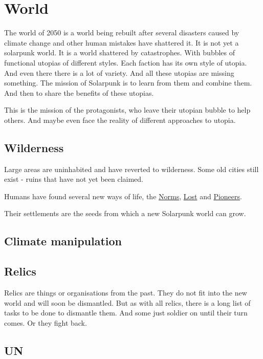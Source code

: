 \chapter{World}

The world of 2050 is a world being rebuilt after several disasters caused by climate change and other human mistakes have shattered it. It is not yet a solarpunk world. It is a world shattered by catastrophes. With bubbles of functional utopias of different styles.
Each faction has its own style of utopia. And even there there is a lot of variety.
And all these utopias are missing something. The mission of Solarpunk is to learn from them and combine them. And then to share the benefits of these utopias.

This is the mission of the protagonists, who leave their utopian bubble to help others. And maybe even face the reality of different approaches to utopia.

\section{Wilderness}

Large areas are uninhabited and have reverted to wilderness. Some old cities still exist - ruins that have not yet been claimed.

Humans have found several new ways of life, the \hyperref[sec:Norms]{Norms}, \hyperref[sec:Lost]{Lost} and \hyperref[sec:Pioneers]{Pioneers}.

Their settlements are the seeds from which a new Solarpunk world can grow.

\section{Climate manipulation}

\section{Relics}
\label{sec:Relic}
Relics are things or organisations from the past. They do not fit into the new world and will soon be dismantled. But as with all relics, there is a long list of tasks to be done to dismantle them. And some just soldier on until their turn comes. Or they fight back.

\section{UN}
\label{sec:UN}

